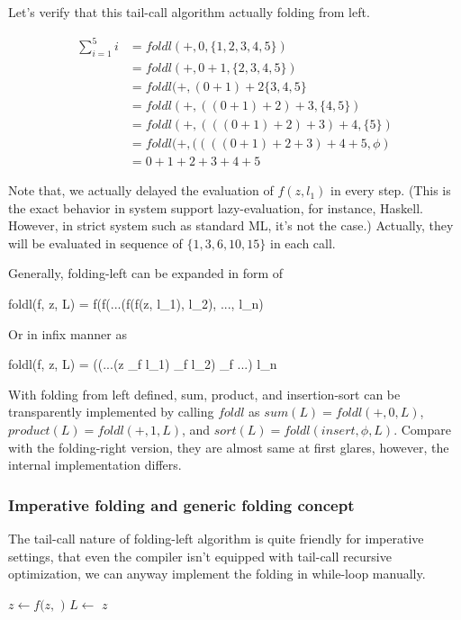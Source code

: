 \documentclass[UTF8]{article}
\begin{document}
Let's verify that this tail-call algorithm actually folding from left.

\[
\begin{array}{rl}
\sum_{i=1}^{5}i & = foldl(+, 0, \{1, 2, 3, 4, 5\}) \\
                & = foldl(+, 0 + 1, \{ 2, 3, 4, 5 \}) \\
                & = foldl(+, (0 + 1) + 2 \{3, 4, 5 \} \\
                & = foldl(+, ((0 + 1) + 2) + 3, \{4, 5\}) \\
                & = foldl(+, (((0 + 1) + 2) + 3) + 4, \{5\}) \\
                & = foldl(+, ((((0 + 1) + 2 + 3) + 4 + 5, \phi) \\
                & = 0 + 1 + 2 + 3 + 4 + 5
\end{array}
\]

Note that, we actually delayed the evaluation of $f(z, l_1)$ in every step. (This is the exact behavior
in system support lazy-evaluation, for instance, Haskell. However, in strict system such as standard ML, it's not the case.) Actually, they will be evaluated in sequence
of $\{ 1, 3, 6, 10, 15\}$ in each call.

Generally, folding-left can be expanded in form of

\be
foldl(f, z, L) = f(f(...(f(f(z, l_1), l_2), ..., l_n)
\ee

Or in infix manner as

\be
foldl(f, z, L) = ((...(z \oplus_f l_1) \oplus_f l_2) \oplus_f ...) \oplus l_n
\ee

With folding from left defined, sum, product, and insertion-sort can be transparently implemented by calling
$foldl$ as $sum(L) = foldl(+, 0, L)$, $product(L) = foldl(+, 1, L)$, and $sort(L) = foldl(insert, \phi, L)$.
Compare with the folding-right version, they are almost same at first glares, however, the internal implementation
differs.

\subsubsection{Imperative folding and generic folding concept}
The tail-call nature of folding-left algorithm is quite friendly for imperative settings, that even the compiler
isn't equipped with tail-call recursive optimization, we can anyway implement the folding in while-loop manually.

\begin{algorithmic}[1]
    \State $z \gets f(z, $  $)$
    \State $L \gets$ 
  \EndWhile
  \State \Return $z$
\EndFunction
\end{algorithmic}
\end{document}
